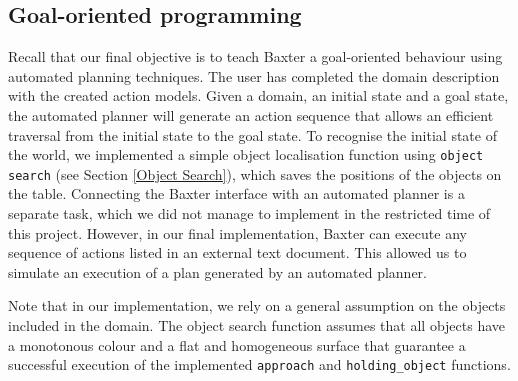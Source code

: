 \subsection{Goal-oriented programming}
Recall that our final objective is to teach Baxter a goal-oriented behaviour using automated planning techniques. The user has completed the domain description with the created action models. Given a domain, an initial state and a goal state, the automated planner will generate an action sequence that allows an efficient traversal from the initial state to the goal state. 
To recognise the initial state of the world, we implemented a simple object localisation function using \texttt{object search} (see Section \ref{Object Search}), which saves the positions of the objects on the table. Connecting the Baxter interface with an automated planner is a separate task, which we did not manage to implement in the restricted time of this project. However, in our final implementation, Baxter can execute any sequence of actions listed in an external text document. This allowed us to simulate an execution of a plan generated by an automated planner.

Note that in our implementation, we rely on a general assumption on the objects included in the domain. The object search function assumes that all objects have a monotonous colour and a flat and homogeneous surface that guarantee a successful execution of the implemented \texttt{approach} and \texttt{holding_object} functions. 


%

